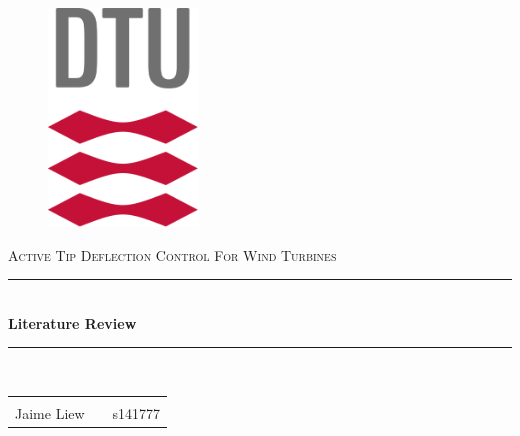 \begin{titlepage}

\newcommand{\HRule}{\rule{\linewidth}{0.5mm}} %

\center %
 
\begin{figure}[H]
\centering
\includegraphics[width=40mm]{Figures/DTU_Logo.png}
\end{figure}
\vspace{3cm}
\textsc{\Large Active Tip Deflection Control For Wind Turbines}\\[0.5cm] 


\HRule \\[0.4cm]
{ \huge \bfseries Literature Review}\\[0.4cm] %
\HRule \\[1.5cm]



\begin{center}
\begin{tabular}{rll}
&\\
\large
Jaime Liew && s141777 \\


\end{tabular}
\end{center}
\end{titlepage}
